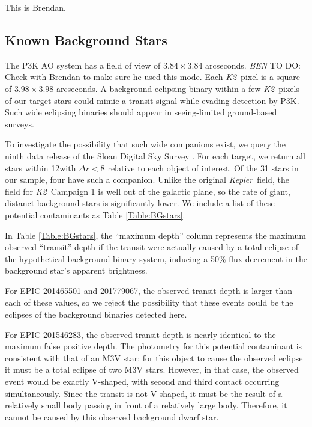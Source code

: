 \documentclass{emulateapj}
\newcommand{\project}[1]{\textsl{#1}}
\newcommand{\kep}{\project{Kepler}}
\newcommand{\KT}{\project{K2}}
\newcommand{\todo}[3]{{\color{#2} \emph{#1} TO DO: #3}}
\newcommand{\btmtodo}[1]{\todo{BEN}{red}{#1}}
\begin{document}
This is Brendan.




\subsection{Known Background Stars}
The P3K AO system has a field of view of $3.84 \times 3.84$ arcseconds.
\btmtodo{Check with Brendan to make sure he used this mode}.
Each \KT\ pixel is a square of $3.98 \times 3.98$ arcseconds. 
A background eclipsing binary within a few \KT\ pixels of our target 
stars could mimic a transit signal while evading detection by P3K.
Such wide eclipsing binaries should appear in seeing-limited ground-based
surveys.

To investigate the possibility that such wide companions exist,
we query the ninth data release of the Sloan Digital Sky Survey 
\citep[SDSS DR9,][]{Ahn12}. 
For each target, we return
all stars within 12\arcsec with $\Delta r < 8$ relative to each object
of interest.
Of the 31 stars in our sample, four have such a companion.
Unlike the original \kep\ field, the field for \KT\ Campaign 1 is 
well out of the galactic plane, so the rate of giant, distanct background
stars is significantly lower.
We include a list of these potential contaminants as Table 
\ref{Table:BGstars}.


In Table \ref{Table:BGstars}, the ``maximum depth'' column represents
the maximum observed ``transit'' depth if the transit were actually caused
by a total eclipse of the hypothetical background binary system, inducing
a 50\% flux decrement in the background star's apparent brightness.

For EPIC 201465501 and 201779067, the observed transit depth is 
larger than each of these values, so we reject the possibility that
these events could be the eclipses of the background binaries detected
here. 

For EPIC 201546283, the observed transit depth is nearly identical to 
the maximum false positive depth. 
The photometry for this potential contaminant is consistent with that
of an M3V star; for this object to cause the observed eclipse it must
be a total eclipse of two M3V stars. 
However, in that case, the observed event would be exactly V-shaped,
with second and third contact occurring simultaneously. 
Since the transit is not V-shaped, it must be the result of
a relatively small body passing in front of a relatively large body. 
Therefore, it cannot be caused by this observed background dwarf star.
\end{document}

